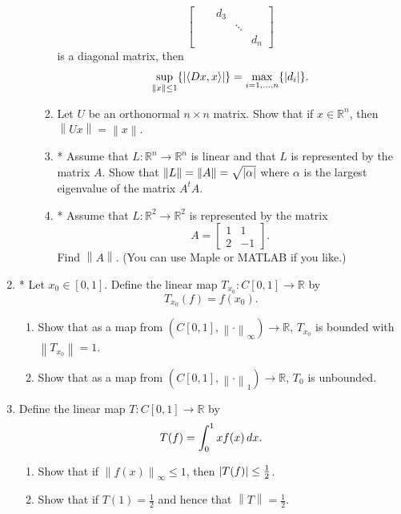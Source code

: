 \documentclass[notoc,notitlepage]{tufte-book}
\newcommand{\norm}[1]{\left\| #1 \right\|}
\begin{document}
\begin{enumerate}
\begin{enumerate}
\begin{enumerate}
\begin{equation*}
\begin{bmatrix}
                     &     & d_3 &        & \\
                     &     &     & \ddots & \\
                     &     &     &        & d_n
              \end{bmatrix}
            \end{equation*}
            is a diagonal matrix, then
            \begin{equation*}
              \sup_{\norm{x} \leq 1} \{ \abs{ \langle Dx, x \rangle } \} = \max_{i = 1, \ldots, n} \{ \abs{ d_i } \}.
            \end{equation*}
          \item Let $U$ be an orthonormal $n \times n$ matrix. Show that if $x \in \mathbb{R}^n$, then $\norm{ Ux } = \norm{x}$.
          \item * Assume that $L : \mathbb{R}^n \to \mathbb{R}^n$ is linear and that $L$ is represented by the matrix $A$. Show that $\norm{L} = \norm{A} = \sqrt{\abs{\alpha}}$ where $\alpha$ is the largest eigenvalue of the matrix $A^t A$.
          \item * Assume that $L : \mathbb{R}^2 \to \mathbb{R}^2$ is represented by the matrix
            \begin{equation*}
              A = \begin{bmatrix}
                1 & 1 \\
                2 & -1
              \end{bmatrix}.
            \end{equation*}
            Find $\norm{A}$. (You can use Maple or MATLAB if you like.)
        \end{enumerate}
    \end{enumerate}

  \item * Let $x_0 \in [0, 1]$. Define the linear map $T_{x_0} : C[0, 1] \to \mathbb{R}$ by
    \begin{equation*}
      T_{x_0}(f) = f(x_0).
    \end{equation*}
    \begin{enumerate}
      \item Show that as a map from $(C[0, 1], \norm\cdot_\infty) \to \mathbb{R}$, $T_{x_0}$ is bounded with $\norm{ T_{x_0} } = 1$.
      \item Show that as a map from $(C[0, 1], \norm\cdot_1) \to \mathbb{R}$, $T_0$ is unbounded.
    \end{enumerate}

  \item Define the linear map $T : C[ 0, 1 ] \to \mathbb{R}$ by
    \begin{equation*}
      T(f) = \int_{0}^{1} xf(x) \mathop{}\!d{x}.
    \end{equation*}
    \begin{enumerate}
      \item Show that if $\norm{ f(x) }_\infty \leq 1$, then $\left| T(f) \right| \leq \frac{1}{2}$.
      \item Show that if $T(1) = \frac{1}{2}$ and hence that $\norm{T} = \frac{1}{2}$.
    \end{enumerate}


\end{enumerate}
\end{document}
